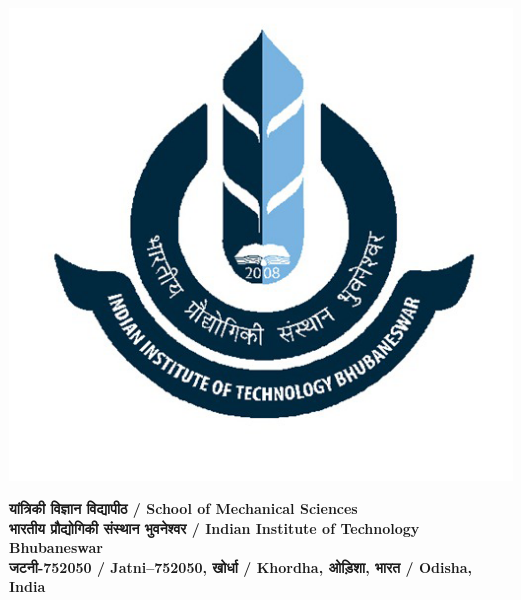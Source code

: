 \documentclass[multi=minipage, border=5]{standalone}
\begin{document}
\raggedright
\begin{minipage}{350bp}
\begin{minipage}{0.14\textwidth}
    {\centering \includegraphics[width=\linewidth, scale=1]{iitbbs.png}}
\end{minipage}%
\hfill
\begin{minipage}{0.85\textwidth}
    \textbf{\footnotesize
    \texthindi{यांत्रिकी विज्ञान विद्यापीठ}
    / School of Mechanical Sciences\\
    \texthindi{भारतीय प्रौद्योगिकी संस्थान भुवनेश्वर}
    / Indian Institute of Technology Bhubaneswar\\
    \texthindi{जटनी-752050}
    / Jatni–752050,
    \texthindi{खोर्धा}
    / Khordha,
    \texthindi{ओड़िशा, भारत}
    / Odisha, India
    }
\end{minipage}
\end{minipage}
\end{document}
